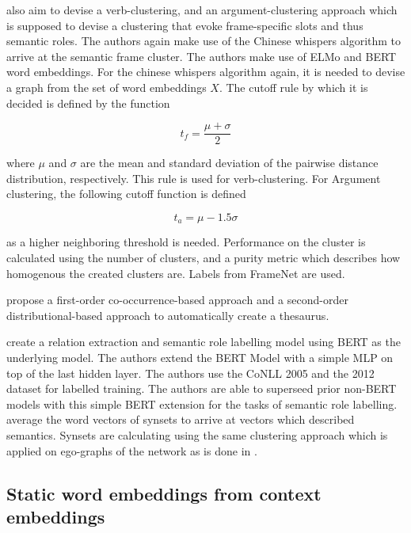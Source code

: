 \documentclass[a4paper,12pt,twoside,openright]{report}
\begin{document}
\cite{ribeiro19} also aim to devise a verb-clustering, and an argument-clustering approach which is supposed to devise a clustering that evoke frame-specific slots and thus semantic roles.
The authors again make use of the Chinese whispers algorithm
\cite{biemann06} to arrive at the semantic frame cluster.
The authors make use of ELMo and BERT word embeddings.
For the chinese whispers algorithm again, it is needed to devise a graph from the set of word embeddings $X$.
The cutoff rule by which it is decided is defined by the function

\begin{equation}
t_f = \frac{\mu + \sigma}{2}
\end{equation}

where $\mu$ and $\sigma$ are the mean and standard deviation of the pairwise distance distribution, respectively. 
This rule is used for verb-clustering.
For Argument clustering, the following cutoff function is defined 

\begin{equation}
t_a = \mu - 1.5 \sigma
\end{equation}

as a higher neighboring threshold is needed.
Performance on the cluster is calculated using the number of clusters, and a purity metric which describes how homogenous the created clusters are. 
Labels from FrameNet \cite{baker98} are used.

\cite{liebeskind19} propose a first-order co-occurrence-based approach and a second-order distributional-based approach to automatically create a thesaurus.

\cite{shi19} create a relation extraction and semantic role labelling model using BERT as the underlying model.
The authors extend the BERT Model with a simple MLP on top of the last hidden layer. 
The authors use the CoNLL 2005 \cite{carreras04} and the 2012  dataset \cite{pradhan13} for labelled training.
The authors are able to superseed prior non-BERT models with this simple BERT extension for the tasks of semantic role labelling. \\

\cite{remus13} average the word vectors of synsets to arrive at vectors which described semantics.
Synsets are calculating using the same clustering approach which is applied on ego-graphs of the network as is done in \cite{biemann06}.

\subsection{Static word embeddings from context embeddings}
\end{document}
